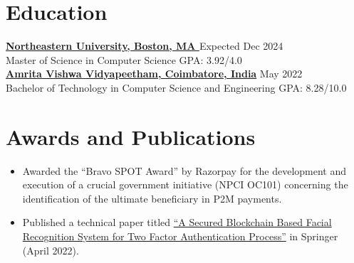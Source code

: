 \documentclass[11pt]{article}       %
\begin{document}
\vspace{-18.5pt}

\section*{Education}
\textbf{\href{https://www.northeastern.edu/}{Northeastern University, Boston, MA }} \hfill Expected Dec 2024 \\
Master of Science in Computer Science \hfill GPA: 3.92/4.0 \\

\textbf{\href{https://www.amrita.edu/}{Amrita Vishwa Vidyapeetham, Coimbatore, India}} \hfill May 2022 \\
Bachelor of Technology in Computer Science and Engineering \hfill GPA: 8.28/10.0 \\

\section*{Awards and Publications}
\begin{itemize}
  \item Awarded the ``Bravo SPOT Award'' by Razorpay for the development and execution of a crucial government initiative (NPCI OC101) concerning the identification of the ultimate beneficiary in P2M payments.
  \item Published a technical paper titled \href{https://link.springer.com/chapter/10.1007/978-981-19-1677-9_44}{``A Secured Blockchain Based Facial Recognition System for Two Factor Authentication Process''} in Springer (April 2022).  
\end{itemize}
\end{document}
